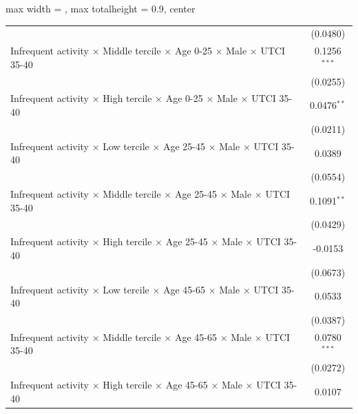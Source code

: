 \begin{table}[htbp]
\begin{adjustbox}{max width = \textwidth, max totalheight = 0.9\textheight, center}
\begin{tabular}{lc}
                                                                                                                 & (0.0480)\\   
         Infrequent activity $\times$ Middle tercile $\times$ Age 0-25 $\times$ Male $\times$ UTCI 35-40         & 0.1256$^{***}$\\   
                                                                                                                 & (0.0255)\\   
         Infrequent activity $\times$ High tercile $\times$ Age 0-25 $\times$ Male $\times$ UTCI 35-40           & 0.0476$^{**}$\\   
                                                                                                                 & (0.0211)\\   
         Infrequent activity $\times$ Low tercile $\times$ Age 25-45 $\times$ Male $\times$ UTCI 35-40           & 0.0389\\   
                                                                                                                 & (0.0554)\\   
         Infrequent activity $\times$ Middle tercile $\times$ Age 25-45 $\times$ Male $\times$ UTCI 35-40        & 0.1091$^{**}$\\   
                                                                                                                 & (0.0429)\\   
         Infrequent activity $\times$ High tercile $\times$ Age 25-45 $\times$ Male $\times$ UTCI 35-40          & -0.0153\\   
                                                                                                                 & (0.0673)\\   
         Infrequent activity $\times$ Low tercile $\times$ Age 45-65 $\times$ Male $\times$ UTCI 35-40           & 0.0533\\   
                                                                                                                 & (0.0387)\\   
         Infrequent activity $\times$ Middle tercile $\times$ Age 45-65 $\times$ Male $\times$ UTCI 35-40        & 0.0780$^{***}$\\   
                                                                                                                 & (0.0272)\\   
         Infrequent activity $\times$ High tercile $\times$ Age 45-65 $\times$ Male $\times$ UTCI 35-40          & 0.0107\\   

\end{tabular}
\end{adjustbox}
\end{table}
